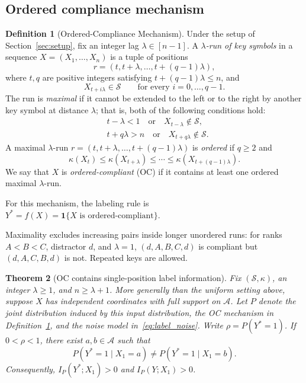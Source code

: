 \documentclass{article} %
\theoremstyle{plain}
\newtheorem{theorem}{Theorem}[section]
\theoremstyle{definition}
\newtheorem{definition}[theorem]{Definition}
\theoremstyle{remark}
\begin{document}
\subsection{Ordered compliance mechanism}
\begin{definition}[Ordered-Compliance Mechanism]
\label{def:compliance}
Under the setup of Section~\ref{sec:setup}, fix an integer lag $\lambda\in[n-1]$. A \emph{$\lambda$-run of key symbols} in a sequence
$X=(X_1,\ldots,X_n)$ is a tuple of positions
\[
r=(t,t+\lambda,\ldots,t+(q-1)\lambda),
\]
where $t,q$ are positive integers satisfying
$t+(q-1)\lambda\leq n$, and
\[
X_{t+i\lambda}\in\mathcal{S}
\qquad
\text{for every }i=0,\ldots,q-1.
\]
The run is \emph{maximal} if it cannot be extended to the left or to the right
by another key symbol at distance $\lambda$; that is, both of the following conditions hold:
\[
\begin{aligned}
&t-\lambda<1
  \quad\text{or}\quad X_{t-\lambda}\notin\mathcal{S},\\
&t+q\lambda>n
  \quad\text{or}\quad X_{t+q\lambda}\notin\mathcal{S}.
\end{aligned}
\]
A maximal $\lambda$-run $r=(t,t+\lambda,\ldots,t+(q-1)\lambda)$ is
\emph{ordered} if $q\geq 2$ and
\[
\kappa(X_t)
\leq
\kappa(X_{t+\lambda})
\leq
\cdots
\leq
\kappa(X_{t+(q-1)\lambda}).
\]
We say that $X$ is \emph{ordered-compliant} (OC) if it contains at least one ordered
maximal $\lambda$-run.

For this mechanism, the labeling rule is $Y^*=f(X)=\mathbf{1}\{X\text{ is ordered-compliant}\}$.

\end{definition}

Maximality excludes increasing pairs inside longer unordered runs: for ranks $A<B<C$, distractor $d$, and $\lambda=1$, $(d,A,B,C,d)$ is compliant but $(d,A,C,B,d)$ is not. Repeated keys are allowed. 

\begin{theorem}[OC contains single-position label information]
\label{thm:impossibility}
Fix $(\mathcal{S},\kappa)$, an integer $\lambda\geq1$, and $n\geq\lambda+1$. More generally than the uniform setting above, suppose $X$ has independent coordinates with full support on $\mathcal{A}$. Let $P$ denote the joint distribution induced by this input distribution, the OC mechanism in Definition~\ref{def:compliance}, and the noise model in~\eqref{eq:label_noise}. Write $\rho=P(Y^*=1)$. If $0<\rho<1$, there exist $a,b\in\mathcal{A}$ such that
\[
P(Y^*=1\mid X_1=a)\neq P(Y^*=1\mid X_1=b).
\]
Consequently, $I_P(Y^*;X_1)>0$ and $I_P(Y;X_1)>0$.
\end{theorem}
\end{document}
